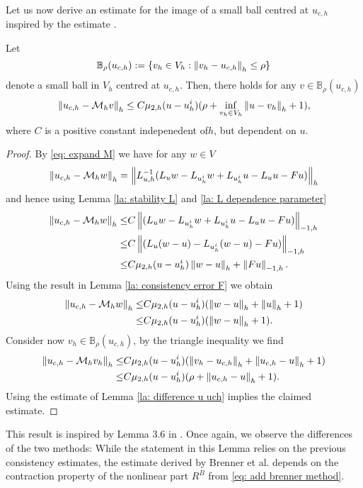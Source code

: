 Let us now derive an estimate for the image of a small ball centred at $u_{c,h}$ inspired by the estimate \cite[Lemma 3.6]{BGN+2011}.
\begin{lemma} \label{la: mapping property of M}
	Let 
	\[
		\mathbb B_\rho(u_{c,h}):=\{v_h \in V_h: \left\lVert v_h - u_{c,h} \right\rVert_{h} \leq \rho\}
	\]
	denote a small ball in $V_h$ centred at $u_{c,h}$. 
	Then, there holds for any $v \in \mathbb B_\rho(u_{c,h})$
	\[
		\left\lVert u_{c,h} - \mathcal M_h v \right\rVert_{h} \leq C \mu_{2,h}(u - u^i_h) (\rho+ \inf_{v_h \in V_h} \left\lVert u-v_h \right\rVert_{h}+1),
	\]
	where $C$ is a positive constant indepenedent of$h$, but dependent on $u$.
\end{lemma}
\begin{proof}
By \eqref{eq: expand M} we have for any $w \in V$
	\begin{align}
		\left\lVert u_{c,h} - \mathcal M_h w \right\rVert_{h} = \left\lVert L_{u,h}^{-1}(L_u w - L_{u^i_h} w + L_{u^i_h}u - L_u u - Fu) \right\rVert_{h}
	\end{align}
	and hence using Lemma \ref{la: stability L} and \ref{la: L dependence parameter}
	\begin{align*}
		\left\lVert u_{c,h} - \mathcal M_h w \right\rVert_{h} 
		\leq& C\left\lVert (L_u w - L_{u^i_h} w + L_{u^i_h} u- L_u u - Fu) \right\rVert_{-1,h} \nonumber\\
		\leq& C\left\lVert (L_u (w-u) - L_{u^i_h} (w-u) - Fu) \right\rVert_{-1,h} \nonumber\\
				\leq& C \mu_{2,h}(u - u^i_h) \left\lVert w-u \right\rVert_{h} +\left\lVert Fu \right\rVert_{-1,h}.
	\end{align*}
	Using the result in Lemma \ref{la: consistency error F} we obtain
	\begin{align*}
		\left\lVert u_{c,h} - \mathcal M_h w \right\rVert_{h} \leq& C \mu_{2,h}(u - u^i_h) (\left\lVert w-u \right\rVert_{h}+\left\lVert u \right\rVert_{h} +1)\nonumber \\
		\leq & C \mu_{2,h}(u - u^i_h) (\left\lVert w-u \right\rVert_{h}+1).
	\end{align*}
	Consider now $v_h \in \mathbb B_\rho(u_{c,h})$, by the triangle inequality we find 
	\begin{align}
		\left\lVert u_{c,h} - \mathcal M_h v_h \right\rVert_{h} 
			\leq& C \mu_{2,h}(u - u^i_h) (\left\lVert v_h-u_{c,h} \right\rVert_{h}+ \left\lVert u_{c,h}-u \right\rVert_{h} +1) \nonumber \\
			\leq& C \mu_{2,h}(u - u^i_h) (\rho+ \left\lVert u_{c,h}-u \right\rVert_{h} +1).
	\end{align}
Using the estimate of Lemma \ref{la: difference u uch} implies the claimed estimate.
\end{proof}

This result is inspired by Lemma 3.6 in \cite{BGN+2011}. Once again, we observe the differences of the two methods: While the statement in this Lemma relies on the previous consistency estimates, the estimate derived by Brenner et al. depends on the contraction property of the nonlinear part $R^B$ from \eqref{eq: add brenner method}. 

